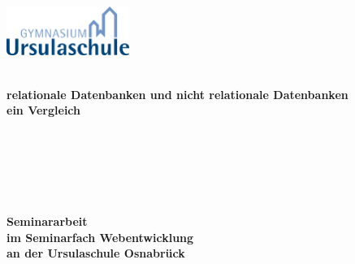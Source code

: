  \thispagestyle{empty}
\begin{titlepage}
	 \thispagestyle{empty}
\begin{center}
	 \thispagestyle{empty}

\begin{center}
	\includegraphics[width=4cm]{"Ursulaschule Logo"}
\end{center}

$~~$\\
\textbf{\huge relationale Datenbanken und nicht relationale Datenbanken \\ ein Vergleich}\paragraph{}$~~$\\
\paragraph{}$~~$\\
\paragraph{}$~~$\\
\textbf{Seminararbeit}\\ \textbf{im Seminarfach Webentwicklung}\\ \textbf{an der Ursulaschule Osnabrück}
\paragraph{}$~~$\\
\paragraph{}$~~$\\
\paragraph{}$~~$\\
\\
\\

\end{center}
\end{titlepage}
